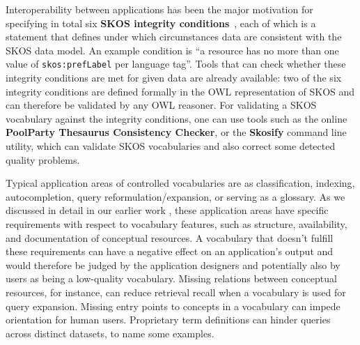


Interoperability between applications has been the major motivation for specifying in total six \textbf{SKOS integrity conditions}~\cite{Miles2005}, each of which is a statement that defines under which circumstances data are consistent with the SKOS data model. An example condition is ``a resource has no more than one value of \texttt{skos:prefLabel} per language tag''. Tools that can check whether these integrity conditions are met for given data are already available: two of the six integrity conditions are defined formally in the OWL representation of SKOS and can therefore be validated by any OWL reasoner. For validating a SKOS vocabulary against the integrity conditions, one can use tools such as the online \textbf{PoolParty Thesaurus Consistency Checker}, or the \textbf{Skosify} command line utility, which can validate SKOS vocabularies and also correct some detected quality problems.


Typical application areas of controlled vocabularies are as classification, indexing, autocompletion, query reformulation/expansion, or serving as a glossary. As we discussed in detail in our earlier work \cite{Nagy2011}, these application areas have specific requirements with respect to vocabulary features, such as structure, availability, and documentation of conceptual resources. A vocabulary that doesn't fulfill these requirements can have a negative effect on an application's output and would therefore be judged by the application designers and potentially also by users as being a low-quality vocabulary. Missing relations between conceptual resources, for instance, can reduce retrieval recall when a vocabulary is used for query expansion. Missing entry points to concepts in a vocabulary can impede orientation for human users. Proprietary term definitions can hinder queries across distinct datasets, to name some examples.


